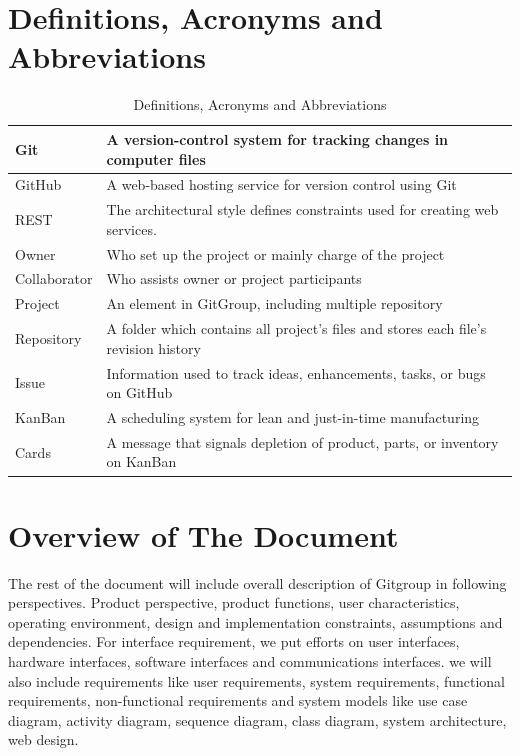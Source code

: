 \documentclass[12pt,a4paper]{report}
\begin{document}
\section[Def., Acronyms and Abbr.]{Definitions, Acronyms and Abbreviations}
\begin{table}[H]
	\centering
	\begin{tabular}{|l|l|}
		\hline
		Git        & A version-control system for tracking changes in computer files                                                                \\ \hline
		GitHub     & A web-based hosting service for version control using Git                                                               \\ \hline
		REST     & The architectural style defines constraints used for creating web services.                                                          \\ \hline
		Owner        & Who set up the project or mainly charge of the project \\ \hline
		Collaborator & Who assists owner or project participants              \\ \hline
		Project      & An element in GitGroup, including multiple repository  \\ \hline
		Repository   & A folder which contains all project's files and stores each file's revision history                                                       		  \\
		\hline
		Issue        & Information used to track ideas, enhancements, tasks, or bugs on GitHub                                                               \\ 
		\hline
		KanBan       & A scheduling system for lean and just-in-time manufacturing                                                         \\ \hline
		Cards        & A message that signals depletion of product, parts, or inventory on KanBan                                                                \\ \hline
	\end{tabular}
	\caption{Definitions, Acronyms and Abbreviations}
\end{table}
\section{Overview of The Document}
The rest of the document will include overall description of Gitgroup in following perspectives. Product perspective, product functions, user characteristics, operating environment, design and implementation constraints, assumptions and dependencies. For interface requirement, we put efforts on user interfaces, hardware interfaces, software interfaces and communications interfaces. we will also include requirements like user requirements, system requirements, functional requirements, non-functional requirements and system models like use case diagram, activity diagram, sequence diagram, class diagram, system architecture, web design. 
\end{document}
